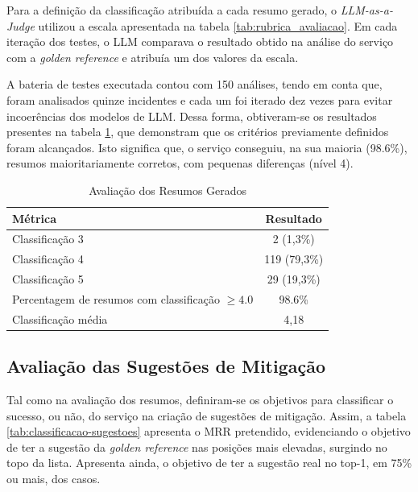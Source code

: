		Para a definição da classificação atribuída a cada resumo gerado, o \textit{LLM-as-a-Judge} utilizou a escala apresentada na tabela \ref{tab:rubrica_avaliacao}. Em cada iteração dos testes, o \gls{LLM} comparava o resultado obtido na análise do serviço com a \textit{golden reference} e atribuía um dos valores da escala.
		
		A bateria de testes executada contou com 150 análises, tendo em conta que, foram analisados quinze incidentes e cada um foi iterado dez vezes para evitar incoerências dos modelos de \gls{LLM}. Dessa forma, obtiveram-se os resultados presentes na tabela \ref{tab:avaliacao-resumos}, que demonstram que os critérios previamente definidos foram alcançados. Isto significa que, o serviço conseguiu, na sua maioria (98.6\%), resumos maioritariamente corretos, com pequenas diferenças (nível 4).
		
		\begin{table}[H]
			\centering
			\small
			\begin{tabular}{lc}
				\hline
				\textbf{Métrica} & \textbf{Resultado} \\
				\hline
				Classificação 3 & 2 (1,3\%) \\
				\hline
				Classificação 4 & 119 (79,3\%) \\
				\hline
				Classificação 5 & 29 (19,3\%) \\
				\hline
				Percentagem de resumos com classificação $\geq4.0$ & 98.6\% \\
				\hline
				Classificação média & 4,18 \\
				\hline
			\end{tabular}
			\caption[Avaliação dos Resumos Gerados]{Avaliação dos Resumos Gerados}
			\label{tab:avaliacao-resumos}
		\end{table}
	
	\subsection{Avaliação das Sugestões de Mitigação}
	
		
		Tal como na avaliação dos resumos, definiram-se os objetivos para classificar o sucesso, ou não, do serviço na criação de sugestões de mitigação. Assim, a tabela \ref{tab:classificacao-sugestoes} apresenta o \gls{MRR} pretendido, evidenciando o objetivo de ter a sugestão da \textit{golden reference} nas posições mais elevadas, surgindo no topo da lista. Apresenta ainda, o objetivo de ter a sugestão real no top-1, em 75\% ou mais, dos casos.
				
